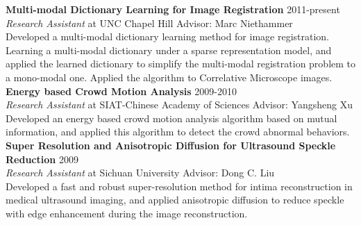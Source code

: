 \documentclass[line,margin]{res}
\begin{document}
\begin{resume}
\textbf{Multi-modal Dictionary Learning for Image Registration} \hfill      2011-present \\
\textit{ Research Assistant} at UNC Chapel Hill  \hfill {Advisor: Marc Niethammer}\\
Developed a multi-modal dictionary learning method for image registration. Learning a multi-modal dictionary under a sparse representation model, and applied the learned dictionary to simplify the multi-modal registration problem to a mono-modal one. Applied the algorithm to Correlative Microscope images.\vspace{.05in}
\\ %
\textbf{Energy based Crowd Motion Analysis} \hfill      2009-2010 \\
\textit{Research Assistant} at SIAT-Chinese Academy of Sciences \hfill {Advisor: Yangsheng Xu}\\
Developed an energy based crowd motion analysis algorithm based on mutual information, and
applied this algorithm to detect the crowd abnormal behaviors.\vspace{.05in}
\\ %
\textbf{Super Resolution and Anisotropic Diffusion for Ultrasound Speckle Reduction} \hfill      2009 \\
\textit{Research Assistant} at Sichuan University \hfill {Advisor: Dong C. Liu}\\
Developed a fast and robust super-resolution method for intima reconstruction in medical
ultrasound imaging, and applied anisotropic diffusion to reduce speckle with edge enhancement during the image reconstruction. \vspace{.05in} %






\end{resume}
\end{document}
